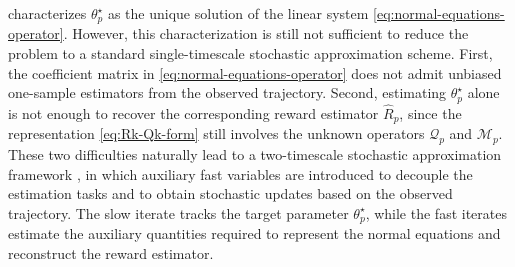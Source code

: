 \documentclass{article}
\theoremstyle{definition}
\theoremstyle{remark}
\theoremstyle{plain}
\newcommand{\dsieve}{p}
\numberwithin{equation}{section}
\begin{document}
 characterizes \(\theta_\dsieve^\star\) as the unique solution of the linear system \eqref{eq:normal-equations-operator}. However, this characterization is still not sufficient to reduce the problem to a standard single-timescale stochastic approximation scheme. First, the coefficient matrix in \eqref{eq:normal-equations-operator} does not admit unbiased one-sample estimators from the observed trajectory. Second, estimating \(\theta_\dsieve^\star\) alone is not enough to recover the corresponding reward estimator \(\widehat R_\dsieve\), since the representation \eqref{eq:Rk-Qk-form} still involves the unknown operators \(\mathcal Q_\dsieve\) and \(\mathcal M_\dsieve\). These two difficulties naturally lead to a two-timescale stochastic approximation framework \cite{butyrin2026gaussian}, in which auxiliary fast variables are introduced to decouple the estimation tasks and to obtain stochastic updates based on the observed trajectory. The slow iterate tracks the target parameter \(\theta_\dsieve^\star\), while the fast iterates estimate the auxiliary quantities required to represent the normal equations and reconstruct the reward estimator.
\end{document}

